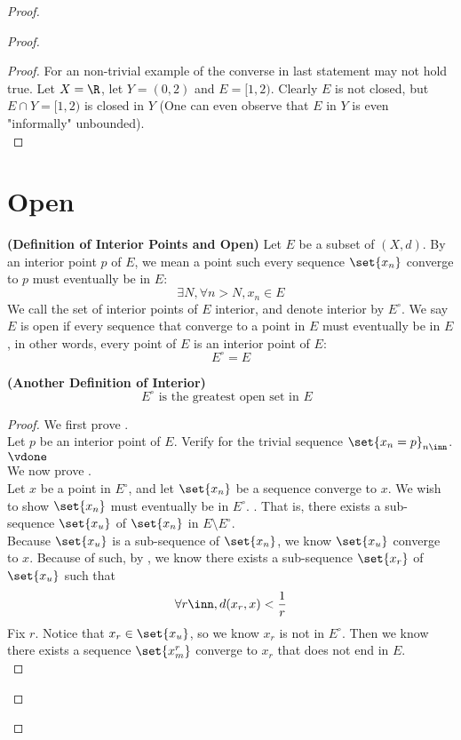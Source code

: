\documentclass{report}
\begin{document}
\begin{proof}
\begin{proof}
\begin{proof}
For an non-trivial example of the converse in last statement may not hold true. Let $X=\R$, let $Y=(0,2)$ and $E=[1,2)$. Clearly $E$ is not closed, but  $E\cap Y=[1,2)$ is closed in $Y$ (One can even observe that $E$ in  $Y$ is even "informally" unbounded).\\
\end{proof}
\section{Open}
\begin{definition}
\label{3.3.1}
\textbf{(Definition of Interior Points and Open)} Let $E$ be a subset of $(X,d)$. By an interior point $p$ of $E$, we mean a point such every sequence  $\set{x_n}$ converge to $p$ must eventually be in  $E$:
 \begin{equation*}
\exists N, \forall n>N, x_n\in E
\end{equation*}
We call the set of interior points of $E$  interior, and denote interior by  $E^\circ $. We say $E$ is open if every sequence that converge to a point in  $E$ must eventually be in  $E$, in other words, every point of $E$ is an interior point of $E$:
 \begin{equation*}
E^\circ =E
\end{equation*}
\end{definition}
\begin{theorem}
\label{3.3.2}
\textbf{(Another Definition of Interior)} 
\begin{equation*}
E^\circ\text{ is the greatest open set in $E$ }
\end{equation*}
\end{theorem}
\begin{proof}
We first prove .\\

Let $p$ be an interior point of $E$. Verify for the trivial sequence $\set{x_n=p}_{n\inn}$. $\vdone$\\

We now prove .\\

Let $x$ be a point in $E^\circ $, and let $\set{x_n}$ be a sequence converge to $x$. We wish to show  $\set{x_n}$ must eventually be in $E^\circ $. . That is, there exists a sub-sequence $\set{x_u}$ of $\set{x_n}$ in $E\setminus E^\circ $.\\

Because $\set{x_u}$ is a sub-sequence of $\set{x_n}$, we know $\set{x_u}$ converge to $x$. Because of such, by  , we know there exists a sub-sequence $\set{x_r}$ of $\set{x_u}$ such that
\begin{equation*}
\forall r\inn, d(x_r,x)<\frac{1}{r}
\end{equation*}
Fix $r$. Notice that $x_r\in \set{x_u}$, so we know $x_r$ is not in  $E^\circ $. Then we know there exists a sequence $\set{x^r_m}$ converge to $x_r$ that does not end in $E$.\\


\end{proof}
\end{proof}
\end{proof}
\end{document}
